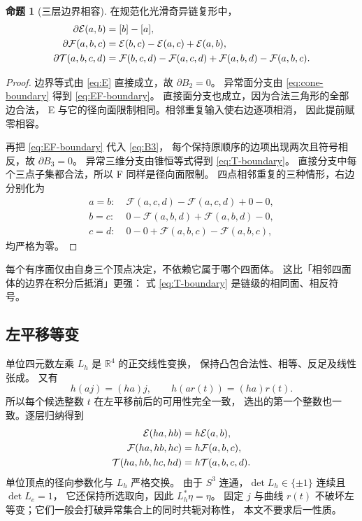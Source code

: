 \documentclass[UTF8,11pt,fontset=none]{ctexart}
\numberwithin{equation}{section}
\theoremstyle{definition}
\newtheorem{proposition}[theorem]{命题}
\newcommand{\R}{\mathbb R}
\begin{document}
\begin{proposition}[三层边界相容]\label{prop:boundary}
在规范化光滑奇异链复形中，
\begin{align}
 \partial\mathcal E(a,b)&=[b]-[a],\notag\\
 \partial\mathcal F(a,b,c)&=
 \mathcal E(b,c)-\mathcal E(a,c)+\mathcal E(a,b),\label{eq:EF-boundary}\\
 \partial\mathcal T(a,b,c,d)&=
 \mathcal F(b,c,d)-\mathcal F(a,c,d)
 +\mathcal F(a,b,d)-\mathcal F(a,b,c).
 \label{eq:T-boundary}
\end{align}
\end{proposition}
\begin{proof}
边界等式由 \eqref{eq:E} 直接成立，故 $\partial B_2=0$。
异常面分支由 \eqref{eq:cone-boundary} 得到 \eqref{eq:EF-boundary}。
直接面分支也成立，因为合法三角形的全部边合法，
E 与它的径向面限制相同。相邻重复输入使右边逐项相消，
因此提前赋零相容。

再把 \eqref{eq:EF-boundary} 代入 \eqref{eq:B3}，
每个保持原顺序的边项出现两次且符号相反，故 $\partial B_3=0$。
异常三维分支由锥恒等式得到 \eqref{eq:T-boundary}。
直接分支中每个三点子集都合法，所以 F 同样是径向面限制。
四点相邻重复的三种情形，右边分别化为
\begin{align*}
 a=b:\;&\mathcal F(a,c,d)-\mathcal F(a,c,d)+0-0,\\
 b=c:\;&0-\mathcal F(a,b,d)+\mathcal F(a,b,d)-0,\\
 c=d:\;&0-0+\mathcal F(a,b,c)-\mathcal F(a,b,c),
\end{align*}
均严格为零。
\end{proof}

每个有序面仅由自身三个顶点决定，不依赖它属于哪个四面体。
这比「相邻四面体的边界在积分后抵消」更强：
式 \eqref{eq:T-boundary} 是链级的相同面、相反符号。

\subsection{左平移等变}

单位四元数左乘 $L_h$ 是 $\R^4$ 的正交线性变换，
保持凸包合法性、相等、反足及线性张成。
又有
\[
 h(aj)=(ha)j,\qquad h(ar(t))=(ha)r(t).
\]
所以每个候选整数 $t$ 在左平移前后的可用性完全一致，
选出的第一个整数也一致。逐层归纳得到
\begin{align}
 \mathcal E(ha,hb)&=h\mathcal E(a,b),\notag\\
 \mathcal F(ha,hb,hc)&=h\mathcal F(a,b,c),\label{eq:equivariance}\\
 \mathcal T(ha,hb,hc,hd)&=h\mathcal T(a,b,c,d).\notag
\end{align}
单位顶点的径向参数化与 $L_h$ 严格交换。
由于 $S^3$ 连通，$\det L_h\in\{\pm1\}$ 连续且 $\det L_e=1$，
它还保持所选取向，因此 $L_h^*\eta=\eta$。
固定 $j$ 与曲线 $r(t)$ 不破坏左等变；它们一般会打破异常集合上的同时共轭对称性，
本文不要求后一性质。
\end{document}
